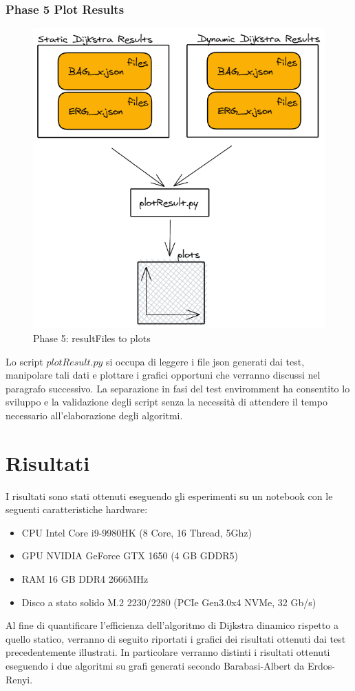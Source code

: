 \documentclass[a4paper]{article}
\begin{document}
\subsubsection{Phase 5 Plot Results}
\begin{figure}[!h]
\includegraphics[scale=0.4]{img/05_resultFiles_to_plots}
\centering
\caption{Phase 5: resultFiles to plots}
\end{figure}
Lo script $plotResult.py$ si occupa di leggere i file json generati dai test, manipolare tali dati e plottare i grafici opportuni che verranno discussi nel paragrafo successivo. La separazione in fasi del test enviromment ha consentito lo sviluppo e la validazione degli script senza la necessità di attendere il tempo necessario all'elaborazione degli algoritmi.
\newpage
\section{Risultati}
I risultati sono stati ottenuti eseguendo gli esperimenti su un notebook con le seguenti caratteristiche hardware:
\begin{itemize}
\item CPU Intel Core i9-9980HK (8 Core, 16 Thread, 5Ghz)
\item GPU NVIDIA GeForce GTX 1650 (4 GB GDDR5)
\item RAM 16 GB DDR4 2666MHz
\item Disco a stato solido M.2 2230/2280 (PCIe Gen3.0x4 NVMe, 32 Gb/s)
\end{itemize}
Al fine di quantificare l'efficienza dell'algoritmo di Dijkstra dinamico rispetto a quello statico, verranno di seguito riportati i grafici dei risultati ottenuti dai test precedentemente illustrati.
In particolare verranno distinti i risultati ottenuti eseguendo i due algoritmi su grafi generati secondo Barabasi-Albert da Erdos-Renyi.
\end{document}
